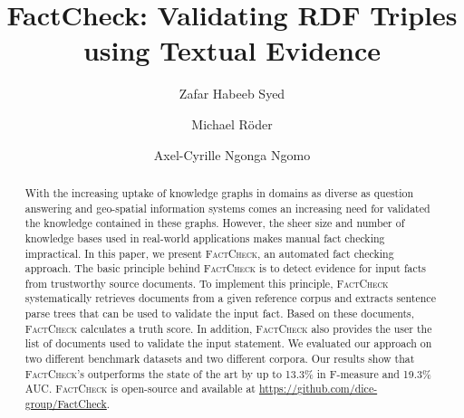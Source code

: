 \documentclass[sigconf]{acmart}
\newcommand{\FactCheck}{\textsc{FactCheck}}
\begin{document}
\title{	FactCheck: Validating RDF Triples using Textual Evidence}


\author{Zafar Habeeb Syed}

\author{Michael R\"oder}

\author{Axel-Cyrille Ngonga Ngomo}

\renewcommand{\shortauthors}{Zafar Syed et al.}


\begin{abstract}
With the increasing uptake of knowledge graphs in domains as diverse as question answering and geo-spatial information systems comes an increasing need for validated the knowledge contained in these graphs. However, the sheer size and number of knowledge bases used in real-world applications makes manual fact checking impractical. In this paper, we present \FactCheck, an automated fact checking approach. The basic principle behind \FactCheck{} is to detect evidence for input facts from trustworthy source documents. To implement this principle, \FactCheck{} systematically retrieves documents from a given reference corpus and extracts sentence parse trees that can be used to validate the input fact. Based on these documents, \FactCheck{} calculates a truth score. In addition, \FactCheck{} also provides the user the list of documents used to validate the input statement. We evaluated our approach on two different benchmark datasets and two different corpora. Our results show that \FactCheck's outperforms the state of the art by up to 13.3\% in F-measure and 19.3\% AUC. \FactCheck{} is open-source and available at \url{https://github.com/dice-group/FactCheck}.
\end{abstract}

%
%






\maketitle





\end{document}
